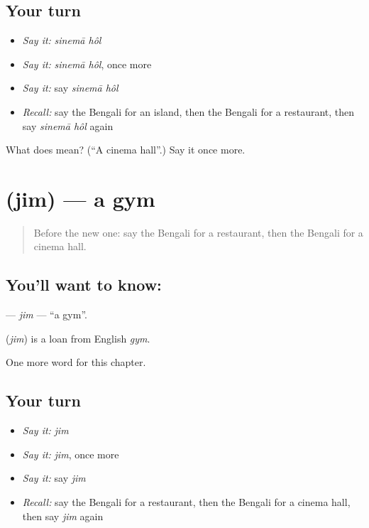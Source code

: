 \subsection*{Your turn}
\begin{itemize}
\raggedright
  \item \emph{Say it:} \emph{sinemā hôl}
  \item \emph{Say it:} \emph{sinemā hôl}, once more
  \item \emph{Say it:} say \emph{sinemā hôl}
  \item \emph{Recall:} say the Bengali for an island, then the Bengali for a restaurant, then say \emph{sinemā hôl} again
\end{itemize}

\begin{tcolorbox}[breakable,colback=teal!4,colframe=teal!35!black,title={Before you move on}]
What does   mean? (\textquotedblleft{}A cinema hall\textquotedblright{}.) Say it once more.
\end{tcolorbox}
\section[\texorpdfstring{\bn{জিম} (jim)}{জিম (jim)}]{ (jim) — a gym}

\label{lesson:BN-C245-jim}



\begin{quote}
Before the new one: say the Bengali for a restaurant, then the Bengali for a cinema hall.
\end{quote}

\subsection*{You'll want to know: }
\textbf{} — \emph{jim} — \textquotedblleft{}a gym\textquotedblright{}.

\begin{cousinweb}
\textbf{} (\emph{jim}) is a loan from English \emph{gym}.
\end{cousinweb}

\begin{grammarlens}[title={What you've built}]
One more word for this chapter.
\end{grammarlens}

\subsection*{Your turn}
\begin{itemize}
\raggedright
  \item \emph{Say it:} \emph{jim}
  \item \emph{Say it:} \emph{jim}, once more
  \item \emph{Say it:} say \emph{jim}
  \item \emph{Recall:} say the Bengali for a restaurant, then the Bengali for a cinema hall, then say \emph{jim} again
\end{itemize}

